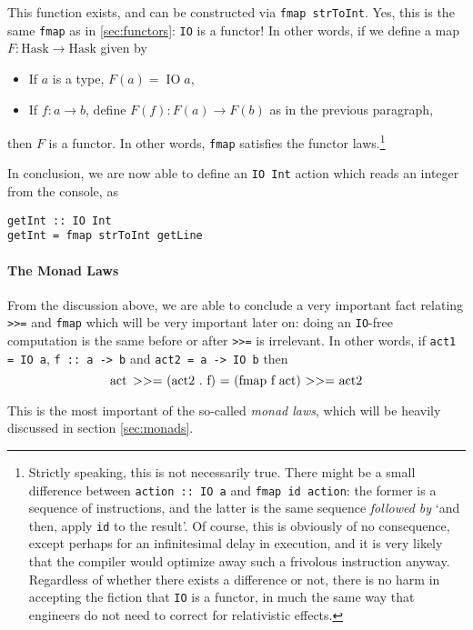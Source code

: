 \documentclass[11pt]{article}
\theoremstyle{nonumberplain}
\newcommand{\Hask}{\mathrm{Hask}}
\newcommand{\typecons}[1]{\mathop{\mathrm{#1}}}
\newcommand*\lsin{\lstinline}
\newcommand*\lsmath[1]{\text{\lstinline|#1|}}
\begin{document}
This function exists, and can be constructed via \lsin|fmap strToInt|. Yes, this is the same \lsin|fmap| as in \ref{sec:functors}: \lsin|IO| is a functor! In other words, if we define a map $F \colon \Hask \to \Hask$ given by
\begin{itemize}
\item If $a$ is a type, $F(a) = \typecons{IO} a$,
\item If $f \colon a \to b$, define $F(f) \colon F(a) \to F(b)$ as in the previous paragraph,
\end{itemize}
then $F$ is a functor. In other words, \lsin|fmap| satisfies the functor laws.\footnote{Strictly speaking, this is not necessarily true. There might be a small difference between \lsin|action :: IO a| and \lsin|fmap id action|: the former is a sequence of instructions, and the latter is the same sequence \emph{followed by} `and then, apply \lsin|id| to the result'. Of course, this is obviously of no consequence, except perhaps for an infinitesimal delay in execution, and it is very likely that the compiler would optimize away such a frivolous instruction anyway. Regardless of whether there exists a difference or not, there is no harm in accepting the fiction that \lsin|IO| is a functor, in much the same way that engineers do not need to correct for relativistic effects.}

In conclusion, we are now able to define an \lsin|IO Int| action which reads an integer from the console, as
\begin{lstlisting}
getInt :: IO Int
getInt = fmap strToInt getLine
\end{lstlisting}

\paragraph{The Monad Laws}

From the discussion above, we are able to conclude a very important fact relating \lsin|>>=| and \lsin|fmap| which will be very important later on: doing an \lsin|IO|-free computation is the same before or after \lsin|>>=| is irrelevant. In other words, if \lsin|act1 = IO a|, \lsin|f :: a -> b| and \lsin|act2 = a -> IO b| then
\begin{equation}
\lsmath{act >>= (act2 . f) = (fmap f act) >>= act2}
\end{equation}

This is the most important of the so-called \emph{monad laws}, which will be heavily discussed in section \ref{sec:monads}.
\end{document}
